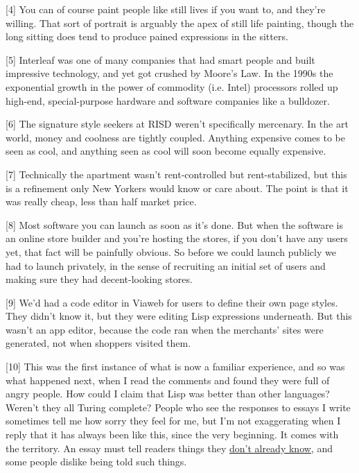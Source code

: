 [4] You can of course paint people like still lives if you want
                  to, and they're willing. That sort of portrait is arguably the
                  apex of still life painting, though the long sitting does tend
                  to produce pained expressions in the sitters.

[5] Interleaf was one of many companies that had smart people
                  and built impressive technology, and yet got crushed by
                  Moore's Law. In the 1990s the exponential growth in the power
                  of commodity (i.e. Intel) processors rolled up high-end,
                  special-purpose hardware and software companies like a
                  bulldozer.

[6] The signature style seekers at RISD weren't specifically
                  mercenary. In the art world, money and coolness are tightly
                  coupled. Anything expensive comes to be seen as cool, and
                  anything seen as cool will soon become equally expensive.

[7] Technically the apartment wasn't rent-controlled but
                  rent-stabilized, but this is a refinement only New Yorkers
                  would know or care about. The point is that it was really
                  cheap, less than half market price.

[8] Most software you can launch as soon as it's done. But when
                  the software is an online store builder and you're hosting the
                  stores, if you don't have any users yet, that fact will be
                  painfully obvious. So before we could launch publicly we had
                  to launch privately, in the sense of recruiting an initial set
                  of users and making sure they had decent-looking stores.

[9] We'd had a code editor in Viaweb for users to define their
                  own page styles. They didn't know it, but they were editing
                  Lisp expressions underneath. But this wasn't an app editor,
                  because the code ran when the merchants' sites were generated,
                  not when shoppers visited them.

[10] This was the first instance of what is now a familiar
                  experience, and so was what happened next, when I read the
                  comments and found they were full of angry people. How could I
                  claim that Lisp was better than other languages? Weren't they
                  all Turing complete? People who see the responses to essays I
                  write sometimes tell me how sorry they feel for me, but I'm
                  not exaggerating when I reply that it has always been like
                  this, since the very beginning. It comes with the territory.
                  An essay must tell readers things they
                  \href{http://www.paulgraham.com/useful.html}{\underline{don't already know}}, and some people dislike being told such things.

